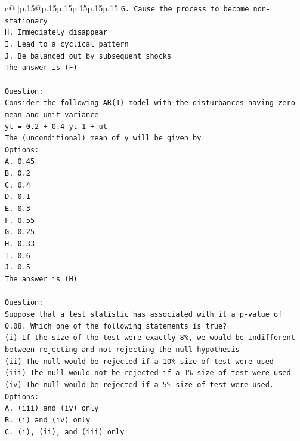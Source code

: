 \documentclass{article}
\begin{document}
{\begin{supertabular}{c@{$\;$}|p{.15\linewidth}@{}p{.15\linewidth}p{.15\linewidth}p{.15\linewidth}p{.15\linewidth}p{.15\linewidth}}
{{{\texttt{G. Cause the process to become non{-}stationary} \\
\texttt{H. Immediately disappear} \\
\texttt{I. Lead to a cyclical pattern} \\
\texttt{J. Be balanced out by subsequent shocks} \\
\texttt{The answer is (F)} \\
\\ 
\texttt{Question:} \\
\texttt{Consider the following AR(1) model with the disturbances having zero mean and unit variance} \\
\texttt{yt = 0.2 + 0.4 yt{-}1 + ut} \\
\texttt{The (unconditional) mean of y will be given by} \\
\texttt{Options:} \\
\texttt{A. 0.45} \\
\texttt{B. 0.2} \\
\texttt{C. 0.4} \\
\texttt{D. 0.1} \\
\texttt{E. 0.3} \\
\texttt{F. 0.55} \\
\texttt{G. 0.25} \\
\texttt{H. 0.33} \\
\texttt{I. 0.6} \\
\texttt{J. 0.5} \\
\texttt{The answer is (H)} \\
\\ 
\texttt{Question:} \\
\texttt{Suppose that a test statistic has associated with it a p{-}value of 0.08. Which one of the following statements is true?} \\
\texttt{(i) If the size of the test were exactly 8\%, we would be indifferent between rejecting and not rejecting the null hypothesis} \\
\texttt{(ii) The null would be rejected if a 10\% size of test were used} \\
\texttt{(iii) The null would not be rejected if a 1\% size of test were used} \\
\texttt{(iv) The null would be rejected if a 5\% size of test were used.} \\
\texttt{Options:} \\
\texttt{A. (iii) and (iv) only} \\
\texttt{B. (i) and (iv) only} \\
\texttt{C. (i), (ii), and (iii) only} \\
}}}
\end{supertabular}}
\end{document}
